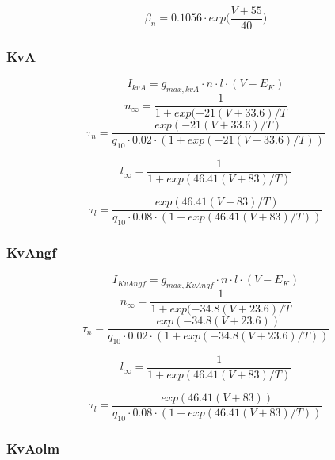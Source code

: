 \documentclass[12pt]{article}
\begin{document}
\begin{equation}
\beta_n = 0.1056 \cdot exp \Big( \frac{V + 55}{40} \Big)
\end{equation}

\subsubsection{KvA}
\begin{equation}
I_{kvA} = g_{max, kvA} \cdot n \cdot l \cdot (V - E_K)
\end{equation}
\begin{equation}
n_{\infty} = \frac{1}{1 + exp(-21(V + 33.6)/T}
\end{equation}
\begin{equation}
\tau_n = \frac{exp(-21(V + 33.6)/T) }
{q_{10} \cdot 0.02 \cdot (1 + exp(-21(V + 33.6)/T))}
\end{equation}

\begin{equation}
l_{\infty} = \frac{1}{1 + exp(46.41(V + 83)/T)}
\end{equation}

\begin{equation}
\tau_l = \frac{exp(46.41(V + 83)/T) }
{q_{10} \cdot 0.08 \cdot (1 + exp(46.41(V + 83)/T))}
\end{equation}

\subsubsection{KvAngf}
\begin{equation}
I_{KvAngf} = g_{max, KvAngf} \cdot n \cdot l \cdot (V - E_K)
\end{equation}
\begin{equation}
n_{\infty} = \frac{1}{1 + exp(-34.8(V + 23.6)/T}
\end{equation}
\begin{equation}
\tau_n = \frac{exp(-34.8(V + 23.6)) }
{q_{10} \cdot 0.02 \cdot (1 + exp(-34.8(V + 23.6)/T))}
\end{equation}

\begin{equation}
l_{\infty} = \frac{1}{1 + exp(46.41(V + 83)/T)}
\end{equation}

\begin{equation}
\tau_l = \frac{exp(46.41(V + 83)) }
{q_{10} \cdot 0.08 \cdot (1 + exp(46.41(V + 83)/T))}
\end{equation}
\subsubsection{KvAolm}
\end{document}
